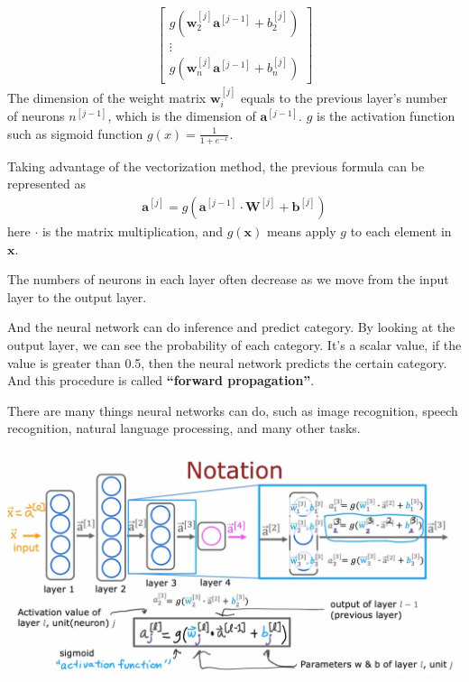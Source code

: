 \begin{notebox}
\begin{align}
\begin{bmatrix}
            g(\mathbf{w}_2^{[j]}\mathbf{a}^{[j-1]} + b_2^{[j]})\\
            \vdots \\
            g(\mathbf{w}_n^{[j]}\mathbf{a}^{[j-1]} + b_n^{[j]})
        \end{bmatrix}
    \end{align}
    \hspace{2em}The dimension of the weight matrix $\mathbf{w}_i^{[j]}$ equals to the previous layer's number
    of neurons $n^{[j - 1]}$, which is the dimension of $\mathbf{a}^{[j - 1]}$.
    $g$ is the activation function such as sigmoid function $g(x) = \frac{1}{1+e^{-x}}$.\par
    \hspace{2em}Taking advantage of the vectorization method, the previous formula can be represented as
    \begin{align}
        \mathbf{a}^{[j]} =  g(\mathbf{a}^{[j - 1]} \cdot \mathbf{W}^{[j]} + \mathbf{b}^{[j]})
    \end{align}
    \hspace{2em} here $\cdot$ is the matrix multiplication, and $g(\mathbf{x})$ means apply $g$ to each element
    in $\mathbf{x}$. 
\end{notebox}
\par
The numbers of neurons in each layer often decrease as we move from the input layer to the output layer.
\par
And the neural network can do inference and predict category.
By looking at the output layer, we can see the probability of each category.
It's a scalar value, if the value is greater than 0.5, then the neural network predicts the certain category.
And this procedure is called \textbf{``forward propagation''}.\par
There are many things neural networks can do, such as image recognition, speech recognition, natural language processing, and many other tasks.

\includegraphics[width=\textwidth]{images/8.2}

